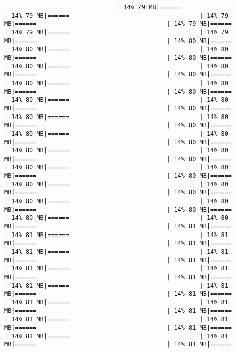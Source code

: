 \documentclass[
]{article}
\begin{document}
\begin{verbatim}
                               | 14% 79 MB|======                                    | 14% 79 MB|======                                    | 14% 79 MB|======                                    | 14% 79 MB|======                                    | 14% 79 MB|======                                    | 14% 79 MB|======                                    | 14% 80 MB|======                                    | 14% 80 MB|======                                    | 14% 80 MB|======                                    | 14% 80 MB|======                                    | 14% 80 MB|======                                    | 14% 80 MB|======                                    | 14% 80 MB|======                                    | 14% 80 MB|======                                    | 14% 80 MB|======                                    | 14% 80 MB|======                                    | 14% 80 MB|======                                    | 14% 80 MB|======                                    | 14% 80 MB|======                                    | 14% 80 MB|======                                    | 14% 80 MB|======                                    | 14% 80 MB|======                                    | 14% 80 MB|======                                    | 14% 80 MB|======                                    | 14% 80 MB|======                                    | 14% 80 MB|======                                    | 14% 80 MB|======                                    | 14% 80 MB|======                                    | 14% 80 MB|======                                    | 14% 80 MB|======                                    | 14% 80 MB|======                                    | 14% 80 MB|======                                    | 14% 80 MB|======                                    | 14% 80 MB|======                                    | 14% 80 MB|======                                    | 14% 80 MB|======                                    | 14% 80 MB|======                                    | 14% 80 MB|======                                    | 14% 80 MB|======                                    | 14% 81 MB|======                                    | 14% 81 MB|======                                    | 14% 81 MB|======                                    | 14% 81 MB|======                                    | 14% 81 MB|======                                    | 14% 81 MB|======                                    | 14% 81 MB|======                                    | 14% 81 MB|======                                    | 14% 81 MB|======                                    | 14% 81 MB|======                                    | 14% 81 MB|======                                    | 14% 81 MB|======                                    | 14% 81 MB|======                                    | 14% 81 MB|======                                    | 14% 81 MB|======                                    | 14% 81 MB|======                                    | 14% 81 MB|======                                    | 14% 81 MB|======                                    | 14% 81 MB|======                                    | 14% 81 MB|======                                    | 14% 81 MB|======                                    | 14% 81 MB|======                              
\end{verbatim}
\end{document}
